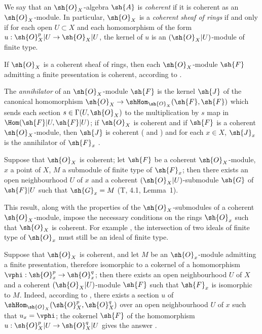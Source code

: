 \begin{env}[5.3.7]
\label{0.5.3.7}
We say that an $\sh{O}_X$-algebra $\sh{A}$ is \emph{coherent} if it is coherent as an $\sh{O}_X$-module.
In particular, $\sh{O}_X$ is a \emph{coherent sheaf of rings} if and only if for each open $U\subset X$ and each homomorphism of the form $u:\sh{O}_X^p|U\to\sh{O}_X|U$, the kernel of $u$ is an $(\sh{O}_X|U)$-module of finite type.

If $\sh{O}_X$ is a coherent sheaf of rings, then each $\sh{O}_X$-module $\sh{F}$ admitting a finite presentation  is coherent, according to .

The \emph{annihilator} of an $\sh{O}_X$-module $\sh{F}$ is the kernel $\sh{J}$ of the canonical homomorphism $\sh{O}_X\to\shHom_{\sh{O}_X}(\sh{F},\sh{F})$ which sends each section $s\in\Gamma(U,\sh{O}_X)$ to the multiplication by $s$ map in $\Hom(\sh{F}|U,\sh{F}|U)$;
if $\sh{O}_X$ is coherent and if $\sh{F}$ is a coherent $\sh{O}_X$-module, then $\sh{J}$ is coherent ( and ) and for each $x\in X$, $\sh{J}_x$ is the annihilator of $\sh{F}_x$ .
\end{env}

\begin{env}[5.3.8]
\label{0.5.3.8}
Suppose that $\sh{O}_X$ is coherent;
let $\sh{F}$ be a coherent $\sh{O}_X$-module, $x$ a point of $X$, $M$ a submodule of finite type of $\sh{F}_x$;
then there exists an open neighbourhood $U$ of $x$ and a coherent $(\sh{O}_X|U)$-submodule $\sh{G}$ of $\sh{F}|U$ such that $\sh{G}_x=M$ (T, 4.1, Lemma~1).

This result, along with the properties of the $\sh{O}_X$-submodules of a coherent $\sh{O}_X$-module, impose the necessary conditions on the rings $\sh{O}_x$ such that $\sh{O}_X$ is coherent.
For example , the intersection of two ideals of finite type of $\sh{O}_x$ must still be an ideal of finite type.
\end{env}

\begin{env}[5.3.9]
\label{0.5.3.9}
Suppose that $\sh{O}_X$ is coherent, and let $M$ be an $\sh{O}_x$-module admitting a finite presentation, therefore isomorphic to a cokernel of a homomorphism $\vphi:\sh{O}_x^p\to\sh{O}_x^q$;
then there exists an open neighbourhood $U$ of $X$ and a coherent $(\sh{O}_X|U)$-module $\sh{F}$ such that $\sh{F}_x$ is isomorphic to $M$.
Indeed, according to , there exists a section $u$ of $\shHom_{\sh{O}_X}(\sh{O}_X^p,\sh{O}_X^q)$ over an open neighbourhood $U$ of $x$ such that $u_x=\vphi$;
the cokernel $\sh{F}$ of the homomorphism $u:\sh{O}_X^p|U\to\sh{O}_X^q|U$ gives the answer .
\end{env}

